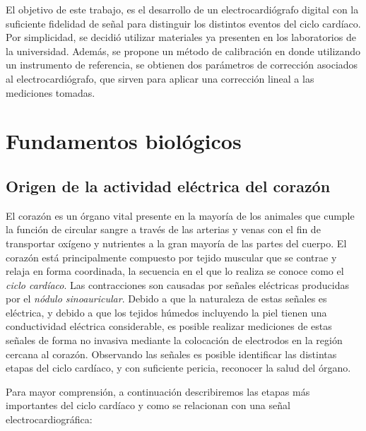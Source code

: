 \documentclass[conference]{IEEEtran}
\begin{document}
 
El objetivo de este trabajo, es el desarrollo de un electrocardiógrafo digital con la
suficiente fidelidad de señal para distinguir los distintos eventos del ciclo cardíaco.
Por simplicidad, se decidió utilizar materiales ya presenten en los laboratorios de la
universidad. Además, se propone un método de calibración en donde utilizando un
instrumento de referencia, se obtienen dos parámetros de corrección asociados al electrocardiógrafo, que sirven para aplicar una corrección lineal a las mediciones tomadas.

\section{Fundamentos biológicos}

\subsection{Origen de la actividad eléctrica del corazón}

El corazón es un órgano vital presente en la mayoría de los animales que cumple la
función de circular sangre a través de las arterias y venas con el fin de
transportar oxígeno y nutrientes a la gran mayoría de las partes del cuerpo.
El corazón está principalmente compuesto por tejido muscular que se contrae y relaja
en forma coordinada, la secuencia en el que lo realiza se conoce como el
\textit{ciclo cardíaco}. Las contracciones son causadas por señales eléctricas
producidas por el \textit{nódulo sinoauricular}. Debido a que la naturaleza de estas
señales es eléctrica, y debido a que los tejidos húmedos incluyendo la piel tienen
una conductividad eléctrica considerable, es posible realizar mediciones de estas
señales de forma no invasiva mediante la colocación de electrodos en la región
cercana al corazón. Observando las señales es posible identificar las distintas
etapas del ciclo cardíaco, y con suficiente pericia, reconocer la salud del órgano.


Para mayor comprensión, a continuación describiremos las etapas más importantes del
ciclo cardíaco y como se relacionan con una señal electrocardiográfica:
\cite{ecg_workings}
\end{document}

